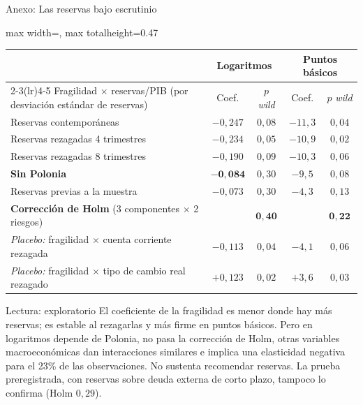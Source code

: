 \documentclass[aspectratio=169]{beamer}
\begin{document}
\begin{frame}{Anexo: Las reservas bajo escrutinio}
\centering
\footnotesize
\begin{adjustbox}{max width=\textwidth, max totalheight=0.47\textheight}
\begin{tabular}{l cc cc}
\toprule
 & \multicolumn{2}{c}{Logaritmos} & \multicolumn{2}{c}{Puntos básicos} \\
\cmidrule(lr){2-3}\cmidrule(lr){4-5}
Fragilidad $\times$ reservas/PIB (por desviación estándar de reservas) & Coef. & $p$ \textit{wild} & Coef. & $p$ \textit{wild} \\
\midrule
Reservas contemporáneas & $-0{,}247$ & $0{,}08$ & $-11{,}3$ & $0{,}04$ \\
Reservas rezagadas 4 trimestres & $-0{,}234$ & $0{,}05$ & $-10{,}9$ & $0{,}02$ \\
Reservas rezagadas 8 trimestres & $-0{,}190$ & $0{,}09$ & $-10{,}3$ & $0{,}06$ \\
\textbf{Sin Polonia} & $\mathbf{-0{,}084}$ & $0{,}30$ & $-9{,}5$ & $0{,}08$ \\
Reservas previas a la muestra & $-0{,}073$ & $0{,}30$ & $-4{,}3$ & $0{,}13$ \\
\textbf{Corrección de Holm} (3 componentes $\times$ 2 riesgos) & & $\mathbf{0{,}40}$ & & $\mathbf{0{,}22}$ \\
\midrule
\textit{Placebo:} fragilidad $\times$ cuenta corriente rezagada & $-0{,}113$ & $0{,}04$ & $-4{,}1$ & $0{,}06$ \\
\textit{Placebo:} fragilidad $\times$ tipo de cambio real rezagado & $+0{,}123$ & $0{,}02$ & $+3{,}6$ & $0{,}03$ \\
\bottomrule
\end{tabular}
\end{adjustbox}
\vspace{-1pt}
\begin{alertblock}{Lectura: exploratorio}
\footnotesize El coeficiente de la fragilidad es menor donde hay más reservas; es estable al rezagarlas y más firme en puntos básicos. Pero en logaritmos depende de Polonia, no pasa la corrección de Holm, otras variables macroeconómicas dan interacciones similares e implica una elasticidad negativa para el 23\% de las observaciones. No sustenta recomendar reservas. La prueba preregistrada, con reservas sobre deuda externa de corto plazo, tampoco lo confirma (Holm $0{,}29$).
\end{alertblock}
\end{frame}
\end{document}
